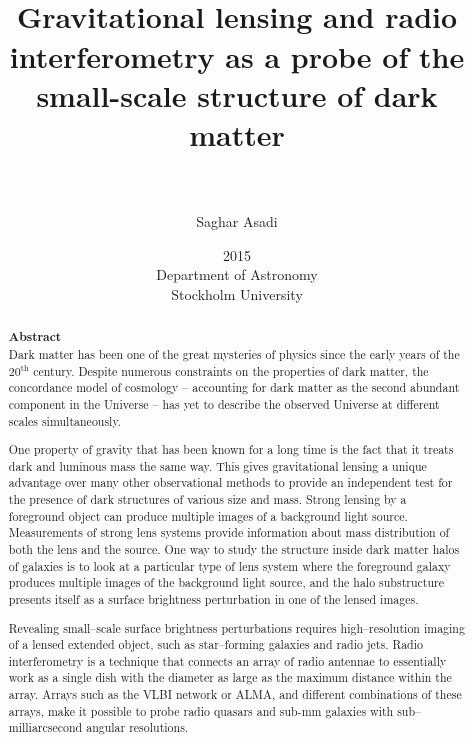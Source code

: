 \documentclass[paper=a4, fontsize=11pt]{scrartcl} %
\title{    
\normalfont \normalsize 
\horrule{0.5pt} \\[0.4cm] %
\huge Gravitational lensing and radio interferometry as a probe of the small-scale structure of dark matter\\
\horrule{2pt} \\[0.5cm] %
}
\author{Saghar Asadi} %
\date{\normalsize 2015 \\ Department of Astronomy \\ Stockholm University} %
\numberwithin{equation}{section} %
\numberwithin{figure}{section} %
\numberwithin{table}{section} %
\begin{document}
\maketitle %
\newpage
\tableofcontents
\newpage

\begin{abstract}
{\Large \bf Abstract}\\


Dark matter has been one of the great mysteries of physics since the early years of the 20$^\mathrm{th}$ century. 
Despite numerous constraints on the properties of dark matter, the concordance model of cosmology -- accounting for dark matter as the second abundant component in the Universe -- has yet to describe the observed Universe at different scales simultaneously.

One property of gravity that has been known for a long time is the fact that it treats dark and luminous mass the same way. This gives gravitational lensing a unique advantage over many other observational methods to provide an independent test for the presence of dark structures of various size and mass. Strong lensing by a foreground object can produce multiple images of a background light source. Measurements of strong lens systems provide information about mass distribution of both the lens and the source. One way to study the structure inside dark matter halos of galaxies is to look at a particular type of lens system where the foreground galaxy produces multiple images of the background light source, and the halo substructure presents itself as a surface brightness perturbation in one of the lensed images.

Revealing small--scale surface brightness perturbations requires high--resolution imaging of a lensed extended object, such as star--forming galaxies and radio jets. Radio interferometry is a technique that connects an array of radio antennae to essentially work as a single dish with the diameter as large as the maximum distance within the array. Arrays such as the VLBI network or ALMA, and different combinations of these arrays, make it possible to probe radio quasars and sub-mm galaxies with sub--milliarcsecond angular resolutions.


\end{abstract}
\end{document}
